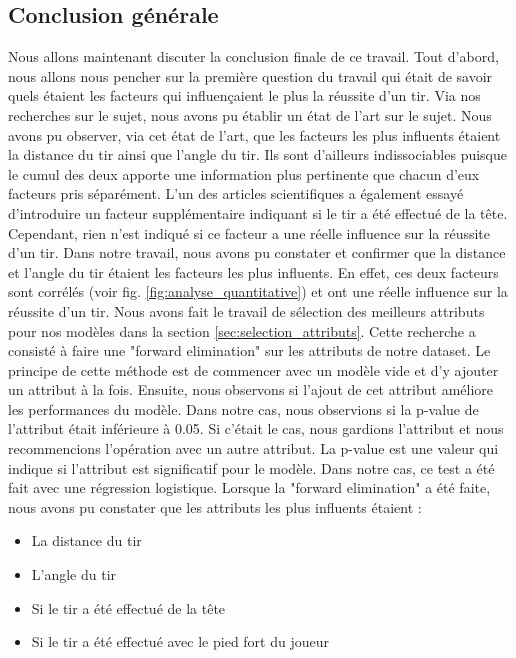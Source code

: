 \documentclass[12pt]{article}
\begin{document}
\subsection{Conclusion générale}
Nous allons maintenant discuter la conclusion finale de ce travail.
Tout d'abord, nous allons nous pencher sur la première question du travail qui était de savoir quels étaient les facteurs qui influençaient le plus la réussite d'un tir.
Via nos recherches sur le sujet, nous avons pu établir un état de l'art sur le sujet.
Nous avons pu observer, via cet état de l'art, que les facteurs les plus influents étaient la distance du tir ainsi que l'angle du tir.
Ils sont d'ailleurs indissociables puisque le cumul des deux apporte une information plus pertinente que chacun d'eux facteurs pris séparément.
L'un des articles scientifiques a également essayé d'introduire un facteur supplémentaire indiquant si le tir a été effectué de la tête.
Cependant, rien n'est indiqué si ce facteur a une réelle influence sur la réussite d'un tir.
\newline\newline
Dans notre travail, nous avons pu constater et confirmer que la distance et l'angle du tir étaient les facteurs les plus influents.
En effet, ces deux facteurs sont corrélés (voir fig. \ref{fig:analyse_quantitative}) et ont une réelle influence sur la réussite d'un tir.
Nous avons fait le travail de sélection des meilleurs attributs pour nos modèles dans la section \ref{sec:selection_attributs}. 
Cette recherche a consisté à faire une "forward elimination" sur les attributs de notre dataset.
Le principe de cette méthode est de commencer avec un modèle vide et d'y ajouter un attribut à la fois.
Ensuite, nous observons si l'ajout de cet attribut améliore les performances du modèle.
Dans notre cas, nous observions si la p-value de l'attribut était inférieure à 0.05.
Si c'était le cas, nous gardions l'attribut et nous recommencions l'opération avec un autre attribut.
La p-value est une valeur qui indique si l'attribut est significatif pour le modèle.
Dans notre cas, ce test a été fait avec une régression logistique.
Lorsque la "forward elimination" a été faite, nous avons pu constater que les attributs les plus influents étaient :
\begin{itemize}
    \item La distance du tir
    \item L'angle du tir
    \item Si le tir a été effectué de la tête
    \item Si le tir a été effectué avec le pied fort du joueur
\end{itemize}
\end{document}

